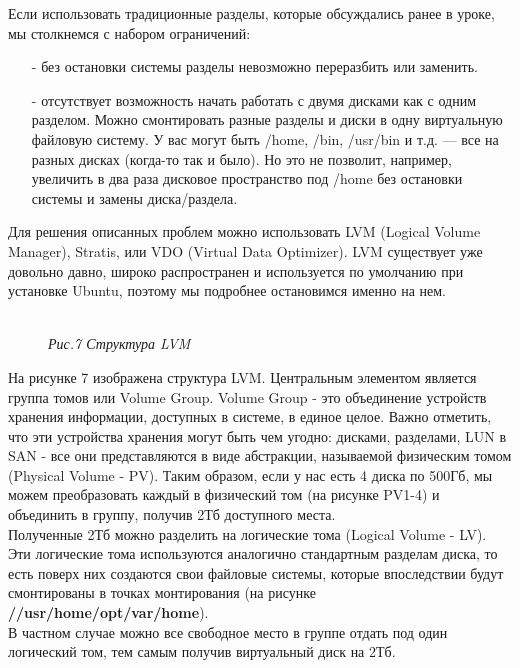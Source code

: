 \documentclass[14pt, a4paper]{article}
\begin{document}
Если использовать традиционные разделы, которые обсуждались ранее в уроке, мы столкнемся с
набором ограничений:

\begin{itemize}
    \item[-] без остановки системы разделы невозможно переразбить или заменить.
    \item[-] отсутствует возможность начать работать с двумя дисками как с одним разделом.
    Можно смонтировать разные разделы и диски в одну виртуальную файловую систему. У вас
    могут быть /home, /bin, /usr/bin и т.д. — все на разных дисках (когда-то так и было). Но это не
    позволит, например, увеличить в два раза дисковое пространство под /home без остановки
    системы и замены диска/раздела.
\end{itemize}

\noindent Для решения описанных проблем можно использовать LVM (Logical Volume Manager), Stratis, или VDO
(Virtual Data Optimizer). LVM существует уже довольно давно, широко распространен и используется
по умолчанию при установке Ubuntu, поэтому мы подробнее остановимся именно на нем.

\begin{figure}[h]
    \centering
    \\ 
    \small\textit{Рис.7 Структура LVM}  
    \label{framework} 
\end{figure}

На рисунке 7 изображена структура LVM. Центральным элементом является группа томов или Volume
Group. Volume Group - это объединение устройств хранения информации, доступных в системе, в
единое целое. Важно отметить, что эти устройства хранения могут быть чем угодно: дисками,
разделами, LUN в SAN - все они представляются в виде абстракции, называемой физическим томом
(Physical Volume - PV). Таким образом, если у нас есть 4 диска по 500Гб, мы можем преобразовать
каждый в физический том (на рисунке PV1-4) и объединить в группу, получив 2Тб доступного места.\\

Полученные 2Тб можно разделить на логические тома (Logical Volume - LV). Эти логические тома
используются аналогично стандартным разделам диска, то есть поверх них создаются свои файловые
системы, которые впоследствии будут смонтированы в точках монтирования (на рисунке 
\textbf{//usr/home/opt/var/home}).\\

В частном случае можно все свободное место в группе отдать под один логический том, тем самым
получив виртуальный диск на 2Тб.\\
\end{document}
